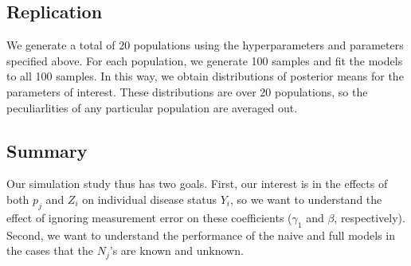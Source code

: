 \documentclass[10pt,a4paper]{article}
\begin{document}
\subsection*{Replication}
We generate a total of 20 populations using the hyperparameters and parameters specified above. For each population, we generate 100 samples and fit the models to all 100 samples. In this way, we obtain distributions of posterior means for the parameters of interest. These distributions are over 20 populations, so the peculiarlities of any particular population are averaged out.

\subsection*{Summary}
Our simulation study thus has two goals. First, our interest is in the effects of both $p_j$ and $Z_i$ on individual disease status $Y_i$, so we want to understand the effect of ignoring measurement error on these coefficients ($\gamma_1$ and $\beta$, respectively). Second, we want to understand the performance of the naive and full models in the cases that the $N_j$'s are known and unknown.




\end{document}
